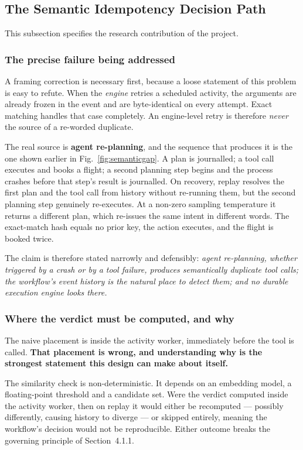 \subsection{The Semantic Idempotency Decision Path}

This subsection specifies the research contribution of the project.

\subsubsection{The precise failure being addressed}

A framing correction is necessary first, because a loose statement of this
problem is easy to refute. When the \emph{engine} retries a scheduled
activity, the arguments are already frozen in the 
event and are byte-identical on every attempt. Exact matching handles that
case completely. An engine-level retry is therefore \emph{never} the source of
a re-worded duplicate.

The real source is \textbf{agent re-planning}, and the sequence that produces
it is the one shown earlier in Fig.~\ref{fig:semanticgap}. A plan is
journalled; a tool call executes and books a flight; a second planning step
begins and the process crashes before that step's result is journalled. On
recovery, replay resolves the first plan and the tool call from history
without re-running them, but the second planning step genuinely re-executes.
At a non-zero sampling temperature it returns a different plan, which
re-issues the same intent in different words. The exact-match hash equals no
prior key, the action executes, and the flight is booked twice.

The claim is therefore stated narrowly and defensibly: \emph{agent
re-planning, whether triggered by a crash or by a tool failure, produces
semantically duplicate tool calls; the workflow's event history is the natural
place to detect them; and no durable execution engine looks there.}

\subsubsection{Where the verdict must be computed, and why}

The naive placement is inside the activity worker, immediately before the tool
is called. \textbf{That placement is wrong, and understanding why is the
strongest statement this design can make about itself.}

The similarity check is non-deterministic. It depends on an embedding model, a
floating-point threshold and a candidate set. Were the verdict computed inside
the activity worker, then on replay it would either be recomputed --- possibly
differently, causing history to diverge --- or skipped entirely, meaning the
workflow's decision would not be reproducible. Either outcome breaks the
governing principle of Section~4.1.1.

